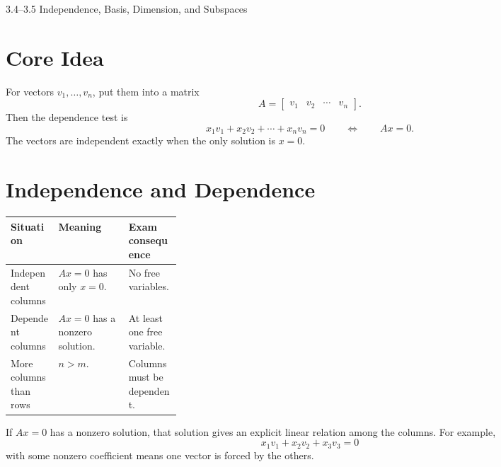 \documentclass[10pt]{article}
\begin{document}
\begin{center}
{\LARGE 3.4--3.5 Independence, Basis, Dimension, and Subspaces\par}
\end{center}

\section{Core Idea}


For vectors \(v_1,\ldots,v_n\), put them into a matrix
\[
A=\begin{bmatrix}v_1&v_2&\cdots&v_n\end{bmatrix}.
\]
Then the dependence test is
\[
x_1v_1+x_2v_2+\cdots+x_nv_n=0
\qquad\Longleftrightarrow\qquad
Ax=0.
\]
The vectors are independent exactly when the only solution is \(x=0\).

\section{Independence and Dependence}

\begin{center}
\small
\begin{tabularx}{\linewidth}{@{}L{0.28\linewidth}Y Y@{}}
\toprule
Situation & Meaning & Exam consequence \\
\midrule
Independent columns & \(Ax=0\) has only \(x=0\). & No free variables. \\
Dependent columns & \(Ax=0\) has a nonzero solution. & At least one free variable. \\
More columns than rows & \(n>m\). & Columns must be dependent. \\
\bottomrule
\end{tabularx}
\end{center}


If \(Ax=0\) has a nonzero solution, that solution gives an explicit linear relation among the columns. For example,
\[
x_1v_1+x_2v_2+x_3v_3=0
\]
with some nonzero coefficient means one vector is forced by the others.
\end{document}
